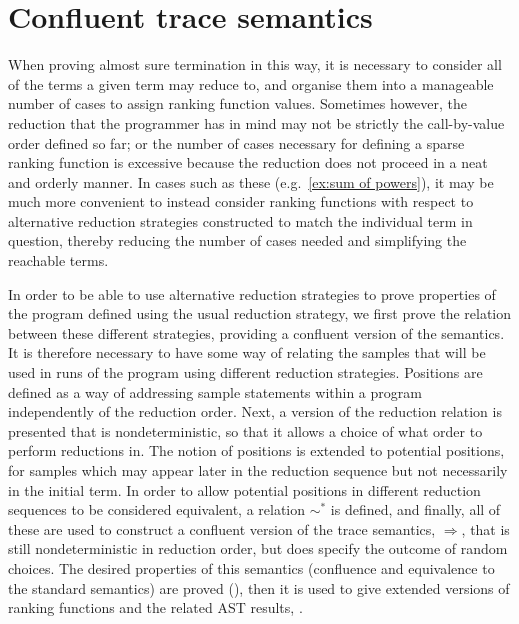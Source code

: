 \section{Confluent trace semantics}
\label{sec:confluent}

When proving almost sure termination in this way, it is necessary to consider all of the terms a given term may reduce to, and organise them into a manageable number of cases to assign ranking function values. 
Sometimes however, the reduction that the programmer has in mind may not be strictly the call-by-value order defined so far; 
or the number of cases necessary for defining a sparse ranking function is excessive because the reduction does not proceed in a neat and orderly manner. 
In cases such as these (e.g.~\cref{ex:sum of powers}), it may be much more convenient to instead consider ranking functions with respect to alternative reduction strategies constructed to match the individual term in question, 
thereby reducing the number of cases needed and simplifying the reachable terms. 

In order to be able to use alternative reduction strategies to prove properties of the program defined using the usual reduction strategy, we first prove the relation between these different strategies, providing a confluent version of the semantics. It is therefore necessary to have some way of relating the samples that will be used in runs of the program using different reduction strategies. Positions are defined as a way of addressing sample statements within a program independently of the reduction order. Next, a version of the reduction relation is presented that is nondeterministic, so that it allows a choice of what order to perform reductions in. The notion of positions is extended to potential positions, for samples which may appear later in the reduction sequence but not necessarily in the initial term. In order to allow potential positions in different reduction sequences to be considered equivalent, a relation $\sim^*$ is defined, and finally, all of these are used to construct a confluent version of the trace semantics, $\Rightarrow$, that is still nondeterministic in reduction order, but does specify the outcome of random choices. The desired properties of this semantics (confluence and equivalence to the standard semantics) are proved (), then it is used to give extended versions of ranking functions and the related AST results, . 

